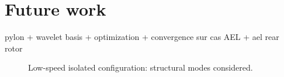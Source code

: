 \section*{Future work}

pylon + wavelet basis + optimization + convergence sur cas AEL + ael rear rotor

\begin{figure}[htp]
  \centering
  \caption{Low-speed isolated configuration: structural modes considered.}
  \label{fig:hera3_perspectives}
\end{figure}
